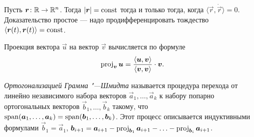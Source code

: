 Пусть $\boldsymbol{r}\colon \mathbb{R} \to \mathbb{R}^n$. Тогда $\left\lvert\boldsymbol{r}\right\rvert = \mathrm{const}$ тогда и только тогда, когда $\langle \vec{r}, \dot{\vec{r}} \rangle = 0$. Доказательство простое --- надо продифференцировать тождество $\langle \boldsymbol{r}(t), \boldsymbol{r}(t) \rangle = \mathrm{const}$.

Проекция вектора $\vec{u}$ на вектор $\vec{v}$ вычисляется по формуле
\[
	\operatorname{proj}_{\boldsymbol{v}}\boldsymbol{u} = \frac{\langle\boldsymbol{u}, \boldsymbol{v}\rangle}{\langle\boldsymbol{v}, \boldsymbol{v}\rangle} \cdot \boldsymbol{v}.
\]

\textit{Ортогонализацией Грамма "---Шмидта} называется процедура перехода от линейно независимого набора векторов $\vec{a}_1, \ldots, \vec{a}_k$ к набору попарно ортогональных векторов $\vec{b}_1, \ldots, \vec{b}_k$ такому, что $\operatorname{span}(\boldsymbol{a}_1, \ldots, \boldsymbol{a}_k) = \operatorname{span}(\boldsymbol{b}_1, \ldots, \boldsymbol{b}_k)$. Этот процесс описывается индуктивными формулами $\vec{b}_1 = \vec{a}_1$, $\boldsymbol{b}_{i + 1} = \boldsymbol{a}_{i + 1} - \operatorname{proj}_{\boldsymbol{b}_1}\boldsymbol{a}_{i + 1} - \ldots - \operatorname{proj}_{\boldsymbol{b}_i}\boldsymbol{a}_{i + 1}$.

